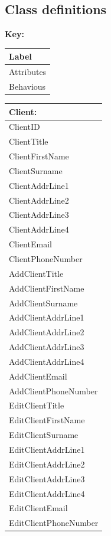 \subsection{Class definitions} 

\begin{flushleft}
\textbf{Key:}
\begin{tabular}{|p{4cm}|}
	\hline
	Label \\ \hline
	Attributes \\ \hline	
	Behavious \\ \hline
\end{tabular}


\end{flushleft}


\begin{tabular}{|p{5cm}|}
	\hline
	\textbf{Client:} \\ \hline
		ClientID \\
		ClientTitle \\
		ClientFirstName \\
		ClientSurname \\
		ClientAddrLine1 \\
		ClientAddrLine2 \\
		ClientAddrLine3 \\
		ClientAddrLine4 \\
		ClientEmail \\
		ClientPhoneNumber \\ \hline
		AddClientTitle \\
		AddClientFirstName \\
		AddClientSurname \\
		AddClientAddrLine1 \\
		AddClientAddrLine2 \\
		AddClientAddrLine3 \\
		AddClientAddrLine4 \\
		AddClientEmail \\
		AddClientPhoneNumber \\ 
		EditClientTitle \\
		EditClientFirstName \\
		EditClientSurname \\
		EditClientAddrLine1 \\
		EditClientAddrLine2 \\
		EditClientAddrLine3 \\
		EditClientAddrLine4 \\
		EditClientEmail \\
		EditClientPhoneNumber \\ \hline
\end{tabular}


